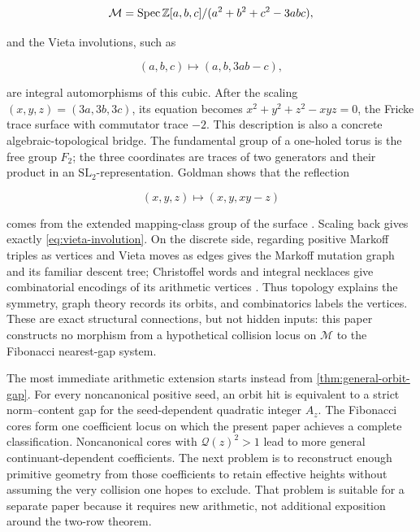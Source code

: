 \begin{equation}
 \mathcal M
 =\operatorname{Spec}
 \mathbb{Z}[a,b,c]/(a^2+b^2+c^2-3abc),
 \label{eq:markoff-scheme}
\end{equation}

and the Vieta involutions, such as

\begin{equation}
 (a,b,c)\longmapsto(a,b,3ab-c),
 \label{eq:vieta-involution}
\end{equation}

are integral automorphisms of this cubic. After the scaling
$(x,y,z)=(3a,3b,3c)$, its equation becomes
$x^2+y^2+z^2-xyz=0$, the Fricke trace surface with commutator trace $-2$.
This description is also a concrete algebraic-topological bridge. The
fundamental group of a one-holed torus is the free group $F_2$; the three
coordinates are traces of two generators and their product in an
$\mathrm{SL}_2$-representation. Goldman shows that the reflection

\[
 (x,y,z)\longmapsto(x,y,xy-z)
\]

comes from the extended mapping-class group of the surface
\cite[Sections~2.1--2.2 and Appendix~A-3]{Goldman2003}. Scaling back gives
exactly \cref{eq:vieta-involution}. On the discrete side, regarding positive
Markoff triples as vertices and Vieta moves as edges gives the Markoff
mutation graph and its familiar descent tree; Christoffel words and integral
necklaces give combinatorial encodings of its arithmetic vertices
\cite{Reutenauer2026,Fisac2025}. Thus topology explains the symmetry, graph
theory records its orbits, and combinatorics labels the vertices. These are
exact structural connections, but not hidden inputs: this paper constructs
no morphism from a hypothetical collision locus on $\mathcal M$ to the
Fibonacci nearest-gap system.

The most immediate arithmetic extension starts instead from
\cref{thm:general-orbit-gap}. For every noncanonical positive seed, an orbit
hit is equivalent to a strict norm--content gap for the seed-dependent
quadratic integer $A_z$. The Fibonacci cores form one coefficient locus on
which the present paper achieves a complete classification. Noncanonical
cores with $\mathcal Q(z)^2>1$ lead to more general continuant-dependent
coefficients. The next problem is to reconstruct enough primitive geometry
from those coefficients to retain effective heights without assuming the
very collision one hopes to exclude. That problem is suitable for a separate
paper because it requires new arithmetic, not additional exposition around
the two-row theorem.

